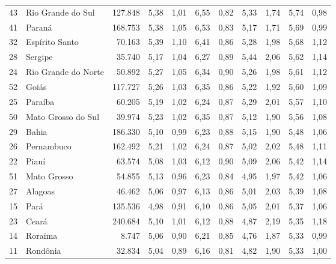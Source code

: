 \begin{table}[]
\begin{tabular}{llrrrrrrrrr}
        \rowcolor[HTML]{DCE6F1}
        43 & Rio Grande do Sul   & 127.848 & 5,38 & 1,01 & 6,55 & 0,82 & 5,33 & 1,74 & 5,74 & 0,98 \\
        41 & Paraná              & 168.753 & 5,38 & 1,05 & 6,53 & 0,83 & 5,17 & 1,71 & 5,69 & 0,99 \\
        \rowcolor[HTML]{DCE6F1}
        32 & Espírito Santo      & 70.163  & 5,39 & 1,10 & 6,41 & 0,86 & 5,28 & 1,98 & 5,68 & 1,12 \\
        28 & Sergipe             & 35.740  & 5,17 & 1,04 & 6,27 & 0,89 & 5,44 & 2,06 & 5,62 & 1,14 \\
        \rowcolor[HTML]{DCE6F1}
        24 & Rio Grande do Norte & 50.892  & 5,27 & 1,05 & 6,34 & 0,90 & 5,26 & 1,98 & 5,61 & 1,12 \\
        52 & Goiás               & 117.727 & 5,26 & 1,03 & 6,35 & 0,86 & 5,22 & 1,92 & 5,60 & 1,09 \\
        \rowcolor[HTML]{DCE6F1}
        25 & Paraíba             & 60.205  & 5,19 & 1,02 & 6,24 & 0,87 & 5,29 & 2,01 & 5,57 & 1,10 \\
        50 & Mato Grosso do Sul  & 39.974  & 5,23 & 1,02 & 6,35 & 0,87 & 5,12 & 1,90 & 5,56 & 1,08 \\
        \rowcolor[HTML]{DCE6F1}
        29 & Bahia               & 186.330 & 5,10 & 0,99 & 6,23 & 0,88 & 5,15 & 1,90 & 5,48 & 1,06 \\
        26 & Pernambuco          & 162.492 & 5,21 & 1,02 & 6,24 & 0,87 & 5,02 & 2,02 & 5,48 & 1,11 \\
        \rowcolor[HTML]{DCE6F1}
        22 & Piauí               & 63.574  & 5,08 & 1,03 & 6,12 & 0,90 & 5,09 & 2,06 & 5,42 & 1,14 \\
        51 & Mato Grosso         & 54.855  & 5,13 & 0,96 & 6,23 & 0,84 & 4,95 & 1,97 & 5,42 & 1,06 \\
        \rowcolor[HTML]{DCE6F1}
        27 & Alagoas             & 46.462  & 5,06 & 0,97 & 6,13 & 0,86 & 5,01 & 2,03 & 5,39 & 1,08 \\
        15 & Pará                & 135.536 & 4,98 & 0,91 & 6,10 & 0,86 & 5,05 & 2,01 & 5,37 & 1,06 \\
        \rowcolor[HTML]{DCE6F1}
        23 & Ceará               & 240.684 & 5,10 & 1,01 & 6,12 & 0,88 & 4,87 & 2,19 & 5,35 & 1,18 \\
        14 & Roraima             & 8.747   & 5,06 & 0,90 & 6,21 & 0,85 & 4,76 & 1,87 & 5,33 & 0,99 \\
        \rowcolor[HTML]{DCE6F1}
        11 & Rondônia            & 32.834  & 5,04 & 0,89 & 6,16 & 0,81 & 4,82 & 1,90 & 5,33 & 1,00 \\

\end{tabular}
\end{table}
